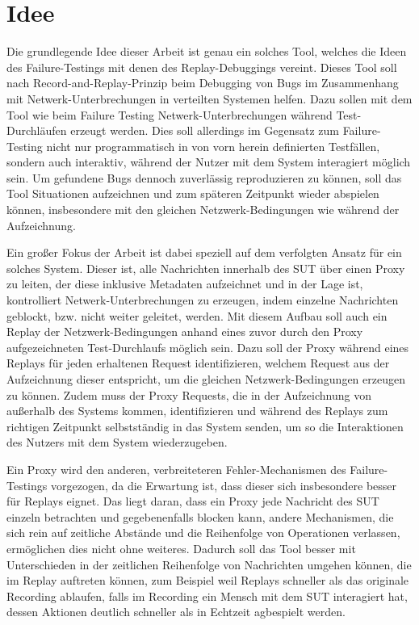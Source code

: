 \documentclass[12pt,a4paper]{report}
\begin{document}
\section{Idee}
\label{chap:idea}
Die grundlegende Idee dieser Arbeit ist genau ein solches Tool, welches die Ideen des Failure-Testings mit denen des
Replay-Debuggings vereint. Dieses Tool soll nach Record-and-Replay-Prinzip beim Debugging von Bugs im Zusammenhang mit
Netwerk-Unterbrechungen in verteilten Systemen helfen. Dazu sollen mit dem Tool wie beim Failure Testing Netwerk-Unterbrechungen
während Test-Durchläufen erzeugt werden. Dies soll allerdings im Gegensatz zum Failure-Testing nicht nur programmatisch in von
vorn herein definierten Testfällen, sondern auch interaktiv, während der Nutzer mit dem System interagiert möglich sein. Um
gefundene Bugs dennoch zuverlässig reproduzieren zu können, soll das Tool Situationen aufzeichnen und zum späteren Zeitpunkt
wieder abspielen können, insbesondere mit den gleichen Netzwerk-Bedingungen wie während der Aufzeichnung.

Ein großer Fokus der Arbeit ist dabei speziell auf dem verfolgten Ansatz für ein solches System. Dieser ist, alle Nachrichten
innerhalb des SUT über einen Proxy zu leiten, der diese inklusive Metadaten aufzeichnet und in der Lage ist, kontrolliert
Netwerk-Unterbrechungen zu erzeugen, indem einzelne Nachrichten geblockt, bzw. nicht weiter geleitet, werden. Mit diesem Aufbau
soll auch ein Replay der Netzwerk-Bedingungen anhand eines zuvor durch den Proxy aufgezeichneten Test-Durchlaufs möglich sein.
Dazu soll der Proxy während eines Replays für jeden erhaltenen Request identifizieren, welchem Request aus der Aufzeichnung dieser
entspricht, um die gleichen Netzwerk-Bedingungen erzeugen zu können. Zudem muss der Proxy Requests, die in der Aufzeichnung von
außerhalb des Systems kommen, identifizieren und während des Replays zum richtigen Zeitpunkt selbstständig in das System senden,
um so die Interaktionen des Nutzers mit dem System wiederzugeben.

Ein Proxy wird den anderen, verbreiteteren Fehler-Mechanismen des Failure-Testings vorgezogen, da die Erwartung ist, dass dieser
sich insbesondere besser für Replays eignet. Das liegt daran, dass ein Proxy jede Nachricht des SUT einzeln betrachten und
gegebenenfalls blocken kann, andere Mechanismen, die sich rein auf zeitliche Abstände und die Reihenfolge von Operationen
verlassen, ermöglichen dies nicht ohne weiteres. Dadurch soll das Tool besser mit Unterschieden in der zeitlichen Reihenfolge von
Nachrichten umgehen können, die im Replay auftreten können, zum Beispiel weil Replays schneller als das originale Recording
ablaufen, falls im Recording ein Mensch mit dem SUT interagiert hat, dessen Aktionen deutlich schneller als in Echtzeit agbespielt
werden.
\end{document}

